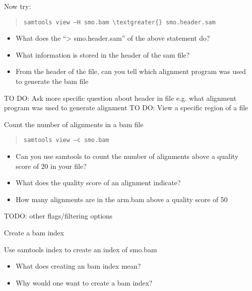 \documentclass[letterpaper,10pt,english]{sphinxmanual}
\begin{document}
Now try:
\begin{quote}

\begin{Verbatim}[commandchars=\\\{\}]
samtools view –H smo.bam \textgreater{} smo.header.sam
\end{Verbatim}
\end{quote}
\begin{itemize}
\item {} 
What does the “\textgreater{} smo.header.sam” of the above statement do?

\item {} 
What information is stored in the header of the sam file?

\item {} 
From the header of the file, can you tell which alignment program was used to generate the bam file

\end{itemize}

TO DO: Ask more specific question about header in file  e.g. what alignment program was used to generate alignment
TO DO: View a specific region of a file

Count the number of alignments in a bam file
\begin{quote}

\begin{Verbatim}[commandchars=\\\{\}]
samtools view –c smo.bam
\end{Verbatim}
\end{quote}
\begin{itemize}
\item {} 
Can you use samtools to count the number of alignments above a quality score of 20 in your file?

\item {} 
What does the quality score of an alignment indicate?

\item {} 
How many alignments are in the arm.bam above a quality score of 50

\end{itemize}

TODO: other flags/filtering options

Create a bam index

Use samtools index to create an index of smo.bam
\begin{itemize}
\item {} 
What does creating an bam index mean?

\item {} 
Why would one want to create a bam index?

\end{itemize}
\end{document}
